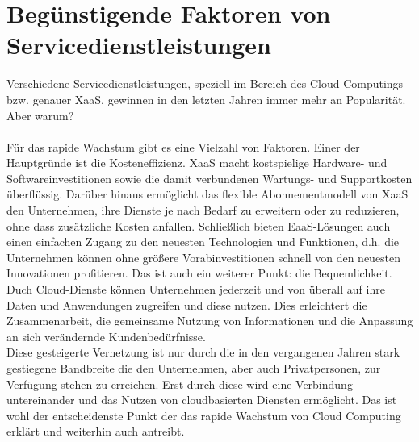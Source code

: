 \section{Begünstigende Faktoren von Servicedienstleistungen}
Verschiedene Servicedienstleistungen, speziell im Bereich des Cloud Computings bzw. genauer XaaS, gewinnen in den letzten Jahren immer mehr an Popularität. Aber warum? \\ \\
Für das rapide Wachstum gibt es eine Vielzahl von Faktoren. Einer der Hauptgründe ist die Kosteneffizienz. XaaS macht kostspielige Hardware- und Softwareinvestitionen sowie die damit verbundenen Wartungs- und Supportkosten überflüssig. Darüber hinaus ermöglicht das flexible Abonnementmodell von XaaS den Unternehmen, ihre Dienste je nach Bedarf zu erweitern oder zu reduzieren, ohne dass zusätzliche Kosten anfallen. Schließlich bieten EaaS-Lösungen auch einen einfachen Zugang zu den neuesten Technologien und Funktionen, d.h. die Unternehmen können ohne größere Vorabinvestitionen schnell von den neuesten Innovationen profitieren. Das ist auch ein weiterer Punkt: die Bequemlichkeit. Duch Cloud-Dienste können Unternehmen jederzeit und von überall auf ihre Daten und Anwendungen zugreifen und diese nutzen. Dies erleichtert die Zusammenarbeit, die gemeinsame Nutzung von Informationen und die Anpassung an sich verändernde Kundenbedürfnisse. \\
Diese gesteigerte Vernetzung ist nur durch die in den vergangenen Jahren stark gestiegene Bandbreite die den Unternehmen, aber auch Privatpersonen, zur Verfügung stehen zu erreichen. Erst durch diese wird eine Verbindung untereinander und das Nutzen von cloudbasierten Diensten ermöglicht. Das ist wohl der entscheidenste Punkt der das rapide Wachstum von Cloud Computing erklärt und weiterhin auch antreibt. \cite[vgl.][]{Hentschel.2016} \\
